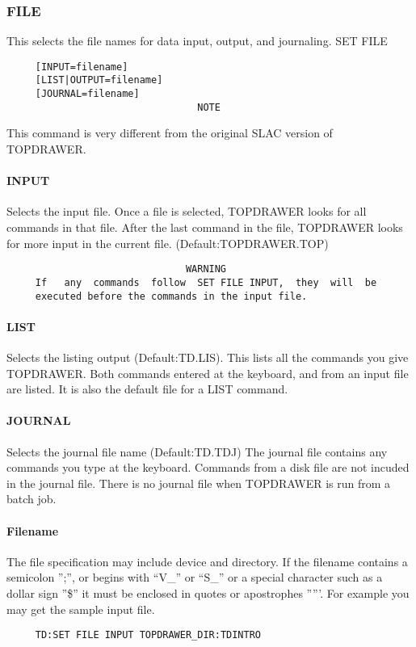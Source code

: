 \subsubsection{FILE}
This selects the file names for data input, output, and journaling.  
SET FILE 
\begin{verbatim}
     [INPUT=filename] 
     [LIST|OUTPUT=filename] 
     [JOURNAL=filename] 
                                 NOTE
\end{verbatim}
This  command  is  very  different  from  the  original SLAC version of
TOPDRAWER.  
\paragraph{INPUT}
Selects the input file.  Once a file is selected, TOPDRAWER looks for
all commands in that file.  After  the  last  command  in  the  file,
TOPDRAWER    looks    for   more   input   in   the   current   file.
(Default:TOPDRAWER.TOP) 

\begin{verbatim}
                               WARNING
     If   any  commands  follow  SET FILE INPUT,  they  will  be
     executed before the commands in the input file.  
\end{verbatim}
\paragraph{LIST}
Selects  the  listing  output  (Default:TD.LIS).   This lists all the
commands you give TOPDRAWER.  Both commands entered at the  keyboard,
and from an input file are listed.  It is also the default file for a
LIST command.  
\paragraph{JOURNAL}
Selects  the  journal  file  name  (Default:TD.TDJ)  The journal file
contains any commands you type at the keyboard.  Commands from a disk
file  are  not incuded in the journal file.  There is no journal file
when TOPDRAWER is run from a batch job.  
\paragraph{Filename}
The  file  specification  may  include  device and directory.  If the
filename contains a semicolon '';'', or begins with ``V\_'' or ``S\_''  or  a
special  character  such  as a dollar sign ''\$'' it must be enclosed in
quotes or apostrophes '''''.  For example you may get the sample  input
file.  
\begin{verbatim}
     TD:SET FILE INPUT TOPDRAWER_DIR:TDINTRO 
\end{verbatim}

